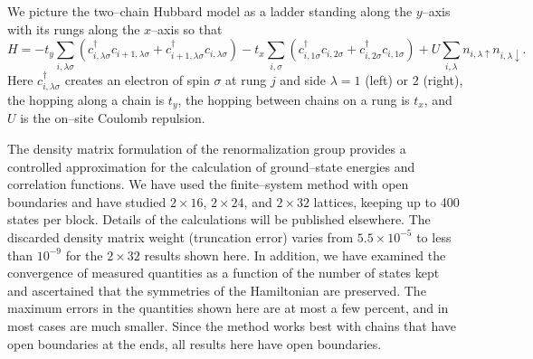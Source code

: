 We picture the two--chain Hubbard model as a ladder standing along the
$y$--axis with its rungs along the $x$--axis so that
\widetext
\begin{equation}
H=
- t_y \sum_{ i, \lambda \sigma}
( c^{\dagger}_{i,\lambda \sigma}c_{i+1,\lambda \sigma} +
 c^{\dagger}_{i+1,\lambda\sigma}c_{i,\lambda \sigma}  )
- t_x \sum_{i, \sigma}
( c^{\dagger}_{i,1 \sigma}c_{i,2 \sigma } +
 c^{\dagger}_{i, 2\sigma}c_{i, 1 \sigma} )
+ U\sum_{ i, \lambda}
n_{i,\lambda \uparrow}n_{i,\lambda \downarrow }.
\end{equation}
\narrowtext
Here $c^{\dagger}_{i, \lambda \sigma}$ creates an electron of spin
$\sigma$ at rung $j$ and side
$\lambda=1$ (left) or $2$ (right),
the hopping along a chain is $t_y$, the hopping between chains on a
rung is $t_x$, and $U$ is the on--site Coulomb repulsion.

The density matrix formulation of the renormalization group
\cite{white} provides a controlled approximation for the calculation
of ground--state energies and correlation functions.
We have used the finite--system method with open boundaries
and have studied $2 \times 16$, $2 \times 24$, and
$2 \times 32$ lattices, keeping up to 400 states per block.
Details of the calculations will be published elsewhere.
The discarded density matrix weight (truncation error) varies from
$5.5 \times 10^{-5}$ to less than
$10^{-9}$ for the $2\times 32$ results shown here.
In addition, we have examined the convergence of measured quantities
as a function of the number of states kept and ascertained that the
symmetries of the Hamiltonian are preserved.
The maximum errors in the quantities shown here are at
most a few percent, and in most cases are much smaller.
Since the method works best with chains that have open boundaries at the
ends, all results here have open boundaries.

